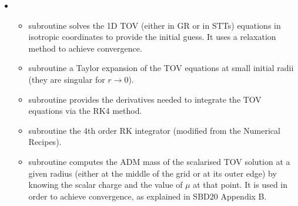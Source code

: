 \documentclass[letterpaper,10pt,english]{sphinxmanual}
\begin{document}
\begin{itemize}
\begin{itemize}
\item {} 
\sphinxAtStartPar
subroutine  evaluate JMAX, XVAL and YVAL (only needed for Uryu Laws, see Franceschetti et al. 2022 A8, A9, A18).

\item {} 
\sphinxAtStartPar
subroutine  \sphinxhyphen{} evaluate FO and DFO in the J\sphinxhyphen{}space for a differential rotator (only needed for Uryu Laws, see Franceschetti et al. 2022 A2, A3).

\item {} 
\sphinxAtStartPar
subroutine  evaluate A3L \(=\int \Omega dj\) in the J\sphinxhyphen{}space for a differential rotator. This is the parameter the enters the Bernoulli Equation for the differential rotation.


\end{itemize}

\item {} 
\sphinxAtStartPar
{}
\begin{itemize}
\item {} 
\sphinxAtStartPar
subroutine  \sphinxhyphen{} solves the 1D TOV (either in GR or in STTs) equations in isotropic coordinates to provide the initial guess. It uses a relaxation method to achieve convergence.

\item {} 
\sphinxAtStartPar
subroutine  \sphinxhyphen{} a Taylor expansion of the TOV equations at small initial radii (they are
singular for \(r \rightarrow 0\)).

\item {} 
\sphinxAtStartPar
subroutine  \sphinxhyphen{} provides the derivatives needed to integrate the TOV equations via the
RK4 method.

\item {} 
\sphinxAtStartPar
subroutine  \sphinxhyphen{} the 4th order RK integrator (modified from the Numerical Recipes).

\item {} 
\sphinxAtStartPar
subroutine  \sphinxhyphen{} computes the ADM mass of the scalarised TOV solution at a given radius (either at the middle of the grid or at its outer edge) by knowing the scalar charge and the value of \(\mu\) at that point. It is used in order to achieve convergence, as explained in SBD20 Appendix B.



\end{itemize}
\end{itemize}
\end{document}
